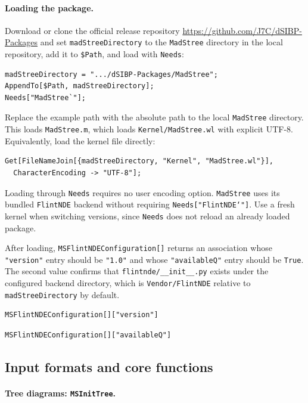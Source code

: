 \documentclass[11pt,a4paper]{article}
\begin{document}
\paragraph{Loading the package.}

Download or clone the official release repository
\url{https://github.com/J7C/dSIBP-Packages} and
set \texttt{madStreeDirectory} to the \texttt{MadStree} directory in the local repository,
add it to \texttt{\$Path}, and load with \texttt{Needs}:
\begin{verbatim}
madStreeDirectory = ".../dSIBP-Packages/MadStree";
AppendTo[$Path, madStreeDirectory];
Needs["MadStree`"];
\end{verbatim}
Replace the example path with the absolute path to the local \texttt{MadStree} directory.
This loads \texttt{MadStree.m}, which loads \texttt{Kernel/MadStree.wl} with explicit UTF-8.
Equivalently, load the kernel file directly:
\begin{verbatim}
Get[FileNameJoin[{madStreeDirectory, "Kernel", "MadStree.wl"}],
  CharacterEncoding -> "UTF-8"];
\end{verbatim}
Loading through \texttt{Needs} requires no user encoding option.
\texttt{MadStree} uses its bundled \texttt{FlintNDE} backend without requiring \texttt{Needs["FlintNDE`"]}.
Use a fresh kernel when switching versions, since \texttt{Needs} does not reload
an already loaded package.

After loading, \texttt{MSFlintNDEConfiguration[]} returns an association whose \texttt{"version"}
entry should be \texttt{"1.0"} and whose \texttt{"availableQ"} entry should be \texttt{True}. The
second value confirms that \texttt{flintnde/\_\_init\_\_.py} exists under the configured backend
directory, which is \texttt{Vendor/FlintNDE} relative to \texttt{madStreeDirectory} by default.
\begin{verbatim}
MSFlintNDEConfiguration[]["version"]
\end{verbatim}
\begin{verbatim}
MSFlintNDEConfiguration[]["availableQ"]
\end{verbatim}

\subsection{Input formats and core functions}
\label{sec:inputs}

\paragraph{Tree diagrams: \texttt{MSInitTree}.}
\end{document}
